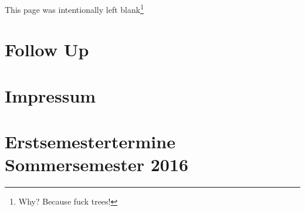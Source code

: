 \documentclass{fsinewsletter}
\begin{document}
This page was intentionally left blank\footnote{Why? Because fuck trees!}
\newpage

\section{Follow Up}


\newpage
\section{Impressum}


%
\newpage
\section{Erstsemestertermine Sommersemester 2016}

\end{document}
